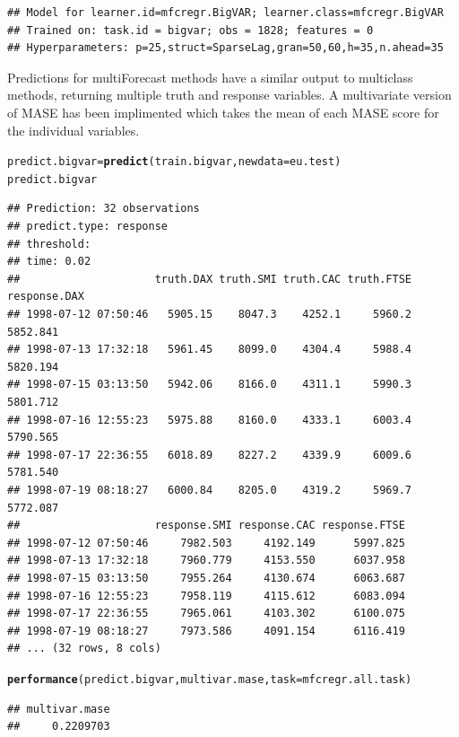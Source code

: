 \documentclass[12pt]{article}\usepackage[]{graphicx}\usepackage[]{color}
\makeatletter
\newcommand{\hlstd}[1]{\textcolor[rgb]{0.345,0.345,0.345}{#1}}%
\newcommand{\hlkwb}[1]{\textcolor[rgb]{0.69,0.353,0.396}{#1}}%
\newcommand{\hlkwc}[1]{\textcolor[rgb]{0.333,0.667,0.333}{#1}}%
\newcommand{\hlkwd}[1]{\textcolor[rgb]{0.737,0.353,0.396}{\textbf{#1}}}%
\newenvironment{kframe}{%
 \def\at@end@of@kframe{}%
 \ifinner\ifhmode%
  \def\at@end@of@kframe{\end{minipage}}%
  \begin{minipage}{\columnwidth}%
 \fi\fi%
 \def\FrameCommand##1{\hskip\@totalleftmargin \hskip-\fboxsep
 \colorbox{shadecolor}{##1}\hskip-\fboxsep
     \hskip-\linewidth \hskip-\@totalleftmargin \hskip\columnwidth}%
 \MakeFramed {\advance\hsize-\width
   \@totalleftmargin\z@ \linewidth\hsize
   \@setminipage}}%
 {\par\unskip\endMakeFramed%
 \at@end@of@kframe}
\newenvironment{knitrout}{}{} %
\theoremstyle{definition}
\newcommand\code{\@codex}
\def\@codex#1{{\normalfont\ttfamily\hyphenchar\font=-1 #1}}
\makeatother
\begin{document}
\begin{knitrout}
\color{fgcolor}\begin{kframe}
\begin{verbatim}
## Model for learner.id=mfcregr.BigVAR; learner.class=mfcregr.BigVAR
## Trained on: task.id = bigvar; obs = 1828; features = 0
## Hyperparameters: p=25,struct=SparseLag,gran=50,60,h=35,n.ahead=35
\end{verbatim}
\end{kframe}
\end{knitrout}
\doublespacing

Predictions for \code{multiForecast} methods have a similar output to \code{multiclass} methods, returning multiple truth and response variables. A multivariate version of MASE has been implimented which takes the mean of each MASE score for the individual variables.

\singlespacing
\begin{knitrout}
\color{fgcolor}\begin{kframe}
\begin{alltt}
\hlstd{predict.bigvar} \hlkwb{=} \hlkwd{predict}\hlstd{(train.bigvar,} \hlkwc{newdata} \hlstd{= eu.test)}
\hlstd{predict.bigvar}
\end{alltt}
\begin{verbatim}
## Prediction: 32 observations
## predict.type: response
## threshold: 
## time: 0.02
##                     truth.DAX truth.SMI truth.CAC truth.FTSE response.DAX
## 1998-07-12 07:50:46   5905.15    8047.3    4252.1     5960.2     5852.841
## 1998-07-13 17:32:18   5961.45    8099.0    4304.4     5988.4     5820.194
## 1998-07-15 03:13:50   5942.06    8166.0    4311.1     5990.3     5801.712
## 1998-07-16 12:55:23   5975.88    8160.0    4333.1     6003.4     5790.565
## 1998-07-17 22:36:55   6018.89    8227.2    4339.9     6009.6     5781.540
## 1998-07-19 08:18:27   6000.84    8205.0    4319.2     5969.7     5772.087
##                     response.SMI response.CAC response.FTSE
## 1998-07-12 07:50:46     7982.503     4192.149      5997.825
## 1998-07-13 17:32:18     7960.779     4153.550      6037.958
## 1998-07-15 03:13:50     7955.264     4130.674      6063.687
## 1998-07-16 12:55:23     7958.119     4115.612      6083.094
## 1998-07-17 22:36:55     7965.061     4103.302      6100.075
## 1998-07-19 08:18:27     7973.586     4091.154      6116.419
## ... (32 rows, 8 cols)
\end{verbatim}
\begin{alltt}
\hlkwd{performance}\hlstd{(predict.bigvar, multivar.mase,} \hlkwc{task} \hlstd{= mfcregr.all.task)}
\end{alltt}
\begin{verbatim}
## multivar.mase 
##     0.2209703
\end{verbatim}
\end{kframe}
\end{knitrout}
\end{document}
